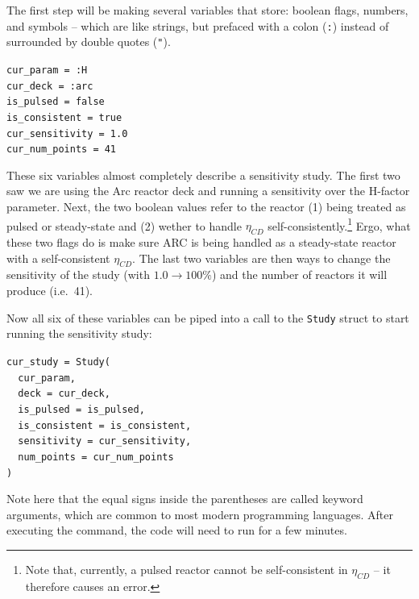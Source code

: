 The first step will be making several variables that store: boolean flags, numbers, and symbols -- which are like strings, but prefaced with a colon (\texttt{:}) instead of surrounded by double quotes (\texttt{"}). 

\begin{addmargin}[1.5em]{1.5em}
\texttt{cur\_param = :H \\
cur\_deck = :arc \\
is\_pulsed = false \\
is\_consistent = true \\
cur\_sensitivity = 1.0 \\
cur\_num\_points = 41
}
\end{addmargin}

These six variables almost completely describe a sensitivity study. The first two saw we are using the Arc reactor deck and running a sensitivity over the H-factor parameter. Next, the two boolean values refer to the reactor (1) being treated as pulsed or steady-state and (2) wether to handle $\eta_{CD}$ self-consistently.\footnote{Note that, currently, a pulsed reactor cannot be self-consistent in $\eta_{CD}$ -- it therefore causes an error.} Ergo, what these two flags do is make sure ARC is being handled as a steady-state reactor with a self-consistent $\eta_{CD}$. The last two variables are then ways to change the sensitivity of the study (with $1.0 \rightarrow 100\%$) and the number of reactors it will produce (i.e.\ 41).

Now all six of these variables can be piped into a call to the \texttt{Study} struct to start running the sensitivity study:

\begin{addmargin}[1.5em]{1.5em}
\texttt{cur\_study = Study( \\
\-\ \-\ cur\_param, \\
\-\ \-\ deck = cur\_deck, \\
\-\ \-\ is\_pulsed = is\_pulsed, \\
\-\ \-\ is\_consistent = is\_consistent, \\
\-\ \-\ sensitivity = cur\_sensitivity, \\
\-\ \-\ num\_points = cur\_num\_points \\
)
}
\end{addmargin}

Note here that the equal signs inside the parentheses are called keyword arguments, which are common to most modern programming languages. After executing the command, the code will need to run for a few minutes.

